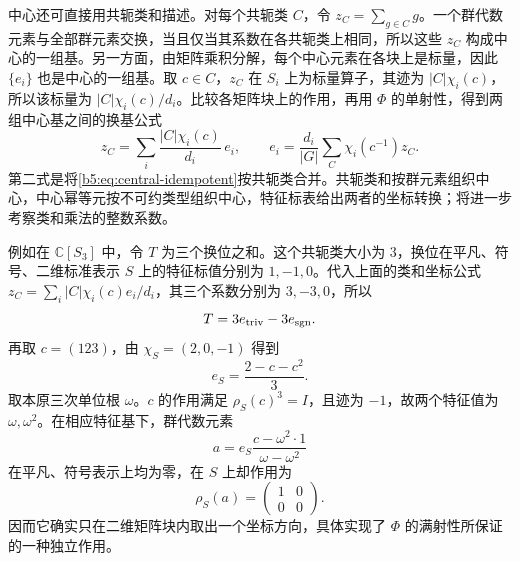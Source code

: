 \ProseParagraphBreak
中心还可直接用共轭类和描述。对每个共轭类 \(C\)，令 \(z_C=\sum_{g\in C}g\)。一个群代数元素与全部群元素交换，当且仅当其系数在各共轭类上相同，所以这些 \(z_C\) 构成中心的一组基。另一方面，由矩阵乘积分解，每个中心元素在各块上是标量，因此 \(\{e_i\}\) 也是中心的一组基。取 \(c\in C\)，\(z_C\) 在 \(S_i\) 上为标量算子，其迹为 \(|C|\chi_i(c)\)，所以该标量为 \(|C|\chi_i(c)/d_i\)。比较各矩阵块上的作用，再用 \(\Phi\) 的单射性，得到两组中心基之间的换基公式
\[
	z_C=\sum_i\frac{|C|\chi_i(c)}{d_i}\,e_i, \qquad e_i=\frac{d_i}{|G|}\sum_C\chi_i(c^{-1})z_C.
\]
第二式是将\eqref{b5:eq:central-idempotent}按共轭类合并。共轭类和按群元素组织中心，中心幂等元按不可约类型组织中心，特征标表给出两者的坐标转换；将进一步考察类和乘法的整数系数。

\ProseParagraphBreak
例如在 \(\mathbb C[S_3]\) 中，令 \(T\) 为三个换位之和。这个共轭类大小为 \(3\)，换位在平凡、符号、二维标准表示 \(S\) 上的特征标值分别为 \(1,-1,0\)。代入上面的类和坐标公式 \(z_C=\sum_i |C|\chi_i(c)e_i/d_i\)，其三个系数分别为 \(3,-3,0\)，所以
\[
	T=3e_{\rm triv}-3e_{\rm sgn}.
\]
再取 \(c=(123)\)，由 \(\chi_S=(2,0,-1)\) 得到
\[
	e_S=\frac{2-c-c^2}{3}.
\]
取本原三次单位根 \(\omega\)。\(c\) 的作用满足 \(\rho_S(c)^3=I\)，且迹为 \(-1\)，故两个特征值为 \(\omega,\omega^2\)。在相应特征基下，群代数元素
\[
	a=e_S\frac{c-\omega^2\cdot1}{\omega-\omega^2}
\]
在平凡、符号表示上均为零，在 \(S\) 上却作用为
\[
	\rho_S(a)=
	\begin{pmatrix}1&0\\0&0\end{pmatrix}.
\]
因而它确实只在二维矩阵块内取出一个坐标方向，具体实现了 \(\Phi\) 的满射性所保证的一种独立作用。
